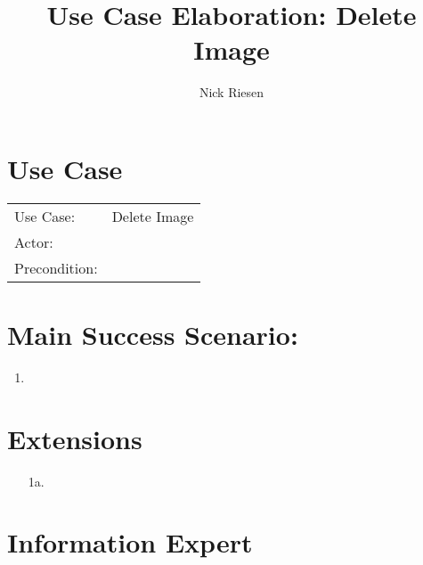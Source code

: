 \documentclass{article}
\title{Use Case Elaboration: Delete Image}
\author{ Nick Riesen }
\begin{document}
\maketitle


\section*{Use Case}
\begin{tabular}{l l}
Use Case:     & Delete Image\\
Actor:        & \\
Precondition: & \\
\end{tabular}


\section*{Main Success Scenario:}

\begin{enumerate}
    \item 

\end{enumerate}

\section*{Extensions}

\begin{itemize}
    \item [1a.]
                            
\end{itemize}


\section*{Information Expert}
\end{document}
